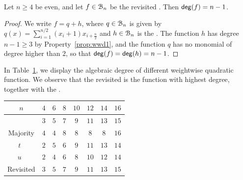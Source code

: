 \documentclass[11pt]{llncs}
\begin{document}


\begin{proposition}
	Let $n\geq 4$ be even, and let $f\in\mathcal{B}_n$ be the revisited \hwbf{}. Then $\mathsf{deg}(f)=n-1$.
\end{proposition}
\begin{proof}
	We write $f=q+h$, where $q\in\mathcal{B}_n$ is given by $q(x)=\sum_{i=1}^{n/2} (x_i+1) x_{i+\frac{n}{2}}$ and $h\in\mathcal{B}_n$ is the \hwbf{}.
	The function $h$ has degree $n-1\geq 3$ by Property~\ref{prop:wwd1}, and the function $q$ has no monomial of degree higher than $2$, so that $\mathsf{deg}(f)=\mathsf{deg}(h)=n-1$.
\end{proof}


In Table~\ref{table:comparisonsDeg}, we display the algebraic degree of different weightwise quadratic function. We observe that the revisited \hwbf{} is the function with highest degree, together with the \hwbf{}. 

\begin{table}
	\centering
	\begin{tabular}{|c| c|c|c|c| c|c|c|}
		\hline
		$n$ & $4$  & $6$  & $8$  &  $10$ & $12$ & $14$ & $16$  \\
		\hline
		\hwbf{}   & $3$  & $5$  & $7$  &  $9$ & $11$ & $13$ & $15$  \\  	
		
		Majority   & $4$  & $4$  & $8$  &  $8$ & $8$ & $8$ & $16$  \\
		
		$t$~\cite{DAM:MeaOza24}   & $2$  & $5$  & $6$  &  $9$ & $11$ & $13$ & $14$\\
		
		$u$~\cite{DAM:MeaOza24}   & $2$  & $4$  & $6$  &  $8$ & $10$ & $12$ & $14$ \\
		
		
		Revisited \hwbf{}  & $3$  & $5$  & $7$  &  $9$ & $11$ & $13$ & $15$\\
		\hline
	\end{tabular}
	\label{table:comparisonsDeg}
\end{table}



\end{document}

